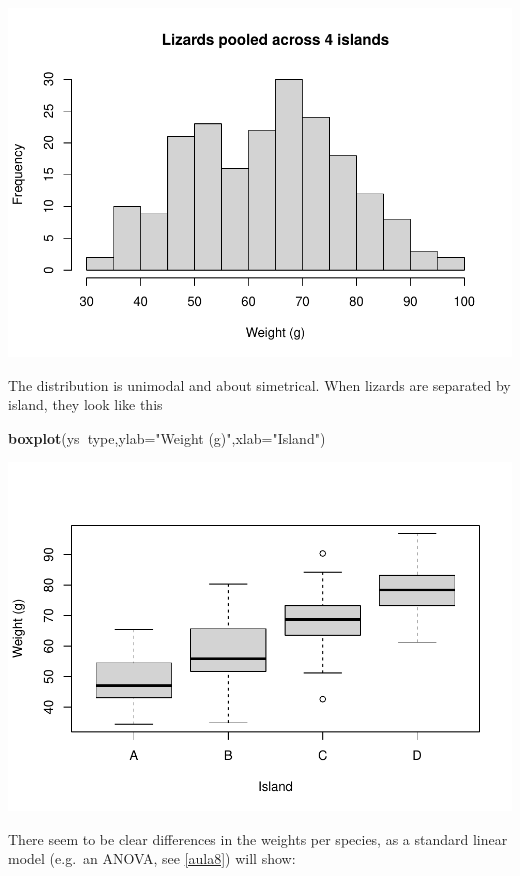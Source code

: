 \documentclass[
]{book}
\newenvironment{Shaded}{\begin{snugshade}}{\end{snugshade}}
\newcommand{\DataTypeTok}[1]{\textcolor[rgb]{0.13,0.29,0.53}{#1}}
\newcommand{\KeywordTok}[1]{\textcolor[rgb]{0.13,0.29,0.53}{\textbf{#1}}}
\newcommand{\NormalTok}[1]{#1}
\newcommand{\OperatorTok}[1]{\textcolor[rgb]{0.81,0.36,0.00}{\textbf{#1}}}
\newcommand{\StringTok}[1]{\textcolor[rgb]{0.31,0.60,0.02}{#1}}
\begin{document}
\includegraphics{ECOMODbook_files/figure-latex/a10.2-1.pdf}

The distribution is unimodal and about simetrical. When lizards are separated by island, they look like this

\begin{Shaded}
\begin{Highlighting}[]
\KeywordTok{boxplot}\NormalTok{(ys}\OperatorTok{~}\NormalTok{type,}\DataTypeTok{ylab=}\StringTok{"Weight (g)"}\NormalTok{,}\DataTypeTok{xlab=}\StringTok{"Island"}\NormalTok{)}
\end{Highlighting}
\end{Shaded}

\includegraphics{ECOMODbook_files/figure-latex/a10.3-1.pdf}

There seem to be clear differences in the weights per species, as a standard linear model (e.g.~an ANOVA, see \ref{aula8}) will show:
\end{document}
